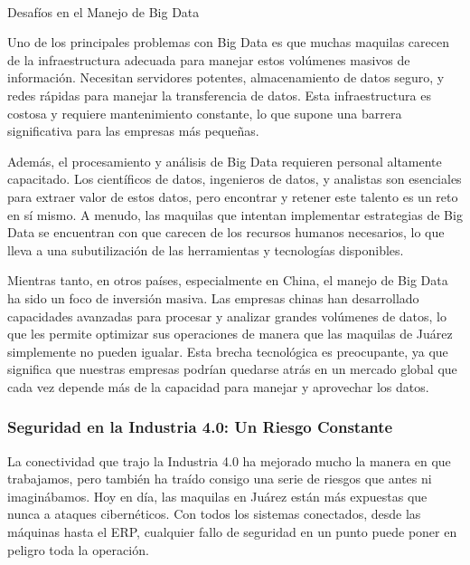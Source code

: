 \documentclass[
  10pt,
  letterpaper,
]{book}
\makeatletter
\let\oldparagraph\paragraph
\renewcommand{\paragraph}{
    \@ifstar
      \xxxParagraphStar
      \xxxParagraphNoStar
  }
\newcommand{\xxxParagraphStar}[1]{\oldparagraph*{#1}\mbox{}}
\newcommand{\xxxParagraphNoStar}[1]{\oldparagraph{#1}\mbox{}}
\makeatother
\begin{document}
\paragraph{Desafíos en el Manejo de Big
Data}\label{desafuxedos-en-el-manejo-de-big-data}

Uno de los principales problemas con Big Data es que muchas maquilas
carecen de la infraestructura adecuada para manejar estos volúmenes
masivos de información. Necesitan servidores potentes, almacenamiento de
datos seguro, y redes rápidas para manejar la transferencia de datos.
Esta infraestructura es costosa y requiere mantenimiento constante, lo
que supone una barrera significativa para las empresas más pequeñas.

Además, el procesamiento y análisis de Big Data requieren personal
altamente capacitado. Los científicos de datos, ingenieros de datos, y
analistas son esenciales para extraer valor de estos datos, pero
encontrar y retener este talento es un reto en sí mismo. A menudo, las
maquilas que intentan implementar estrategias de Big Data se encuentran
con que carecen de los recursos humanos necesarios, lo que lleva a una
subutilización de las herramientas y tecnologías disponibles.

Mientras tanto, en otros países, especialmente en China, el manejo de
Big Data ha sido un foco de inversión masiva. Las empresas chinas han
desarrollado capacidades avanzadas para procesar y analizar grandes
volúmenes de datos, lo que les permite optimizar sus operaciones de
manera que las maquilas de Juárez simplemente no pueden igualar. Esta
brecha tecnológica es preocupante, ya que significa que nuestras
empresas podrían quedarse atrás en un mercado global que cada vez
depende más de la capacidad para manejar y aprovechar los datos.

\subsubsection{Seguridad en la Industria 4.0: Un Riesgo
Constante}\label{seguridad-en-la-industria-4.0-un-riesgo-constante}

La conectividad que trajo la Industria 4.0 ha mejorado mucho la manera
en que trabajamos, pero también ha traído consigo una serie de riesgos
que antes ni imaginábamos. Hoy en día, las maquilas en Juárez están más
expuestas que nunca a ataques cibernéticos. Con todos los sistemas
conectados, desde las máquinas hasta el ERP, cualquier fallo de
seguridad en un punto puede poner en peligro toda la operación.
\end{document}
